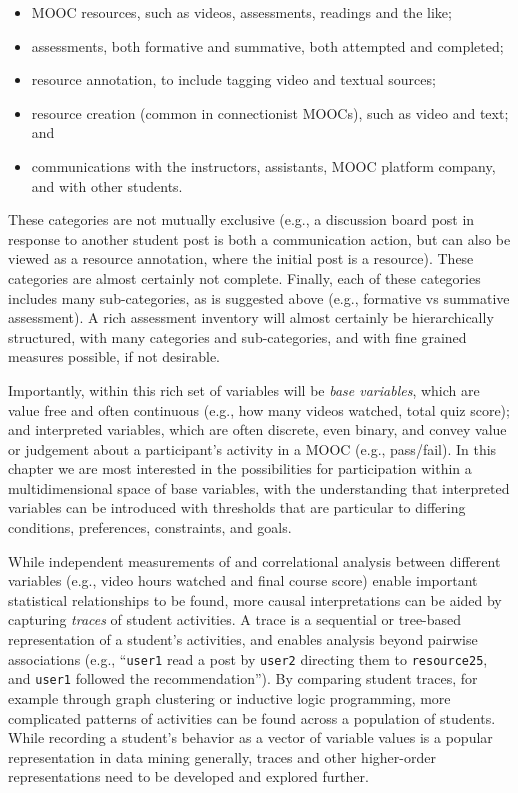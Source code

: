 \begin{itemize}

\item MOOC resources,
such as videos, assessments, readings and the like; 

\item assessments, both
formative and summative, both attempted and completed; 

\item resource
annotation, to include tagging video and textual sources; 

\item resource
creation (common in connectionist MOOCs), such as video and text; and

\item communications with the instructors, assistants, MOOC platform company,
and with other students.

\end{itemize}

These categories are not mutually exclusive (e.g., a discussion board
post in response to another student post is both a communication action,
but can also be viewed as a resource annotation, where the initial post
is a resource). These categories are almost certainly not
complete. Finally, each of these categories includes many
sub-categories, as is suggested above (e.g., formative vs summative
assessment). A rich assessment inventory will almost certainly be
hierarchically structured, with many categories and sub-categories, and
with fine grained measures possible, if not desirable.

Importantly, within this rich set of variables will be \emph{base variables},
which are value free and often continuous (e.g., how many videos
watched, total quiz score); and interpreted variables, which are often
discrete, even binary, and convey value or judgement about a
participant's activity in a MOOC (e.g., pass/fail). In this chapter we
are most interested in the possibilities for participation within a
multidimensional space of base variables, with the understanding that
interpreted variables can be introduced with thresholds that are
particular to differing conditions, preferences, constraints, and goals.

While independent measurements of and correlational analysis between
different variables (e.g., video hours watched and final course score)
enable important statistical relationships to be found, more causal
interpretations can be aided by capturing \emph{traces} of student
activities. A trace is a sequential or tree-based representation of a
student's activities, and enables analysis beyond pairwise associations
(e.g., ``\texttt{user1} read a post by \texttt{user2} directing them to
\texttt{resource25},  and
\texttt{user1} followed the recommendation''). By comparing student traces, for
example through graph clustering or inductive logic programming, more
complicated patterns of activities can be found across a population of
students. While recording a student's behavior as a vector of variable
values is a popular representation in data mining generally, traces and
other higher-order representations need to be developed and explored
further.  

